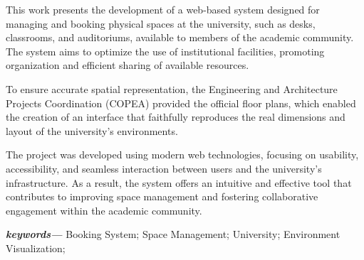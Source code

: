 
This work presents the development of a web-based system designed for managing and booking physical spaces at the university, such as desks, classrooms, and auditoriums, available to members of the academic community. The system aims to optimize the use of institutional facilities, promoting organization and efficient sharing of available resources.

To ensure accurate spatial representation, the Engineering and Architecture Projects Coordination (COPEA) provided the official floor plans, which enabled the creation of an interface that faithfully reproduces the real dimensions and layout of the university’s environments.

The project was developed using modern web technologies, focusing on usability, accessibility, and seamless interaction between users and the university’s infrastructure. As a result, the system offers an intuitive and effective tool that contributes to improving space management and fostering collaborative engagement within the academic community.\hfill \break

\providecommand{\keywords}[1]{\textbf{\textit{keywords---}} #1}
\noindent\keywords{Booking System; Space Management; University; Environment Visualization;}
